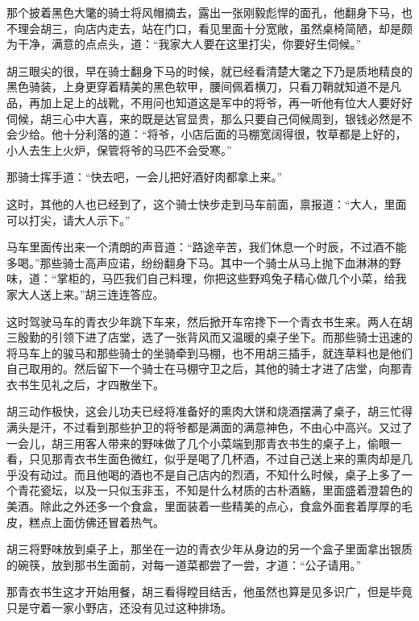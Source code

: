 那个披着黑色大氅的骑士将风帽摘去，露出一张刚毅彪悍的面孔，他翻身下马，也不理会胡三，向店内走去，站在门口，看见里面十分宽敞，虽然桌椅简陋，却是颇为干净，满意的点点头，道：“我家大人要在这里打尖，你要好生伺候。”

胡三眼尖的很，早在骑士翻身下马的时候，就已经看清楚大氅之下乃是质地精良的黑色骑装，上身更穿着精美的黑色软甲，腰间佩着横刀，只看刀鞘就知道不是凡品，再加上足上的战靴，不用问也知道这是军中的将爷，再一听他有位大人要好好伺候，胡三心中大喜，来的既是达官显贵，那么只要自己伺候周到，银钱必然是不会少给。他十分利落的道：“将爷，小店后面的马棚宽阔得很，牧草都是上好的，小人去生上火炉，保管将爷的马匹不会受寒。”

那骑士挥手道：“快去吧，一会儿把好酒好肉都拿上来。”

这时，其他的人也已经到了，这个骑士快步走到马车前面，禀报道：“大人，里面可以打尖，请大人示下。”

马车里面传出来一个清朗的声音道：“路途辛苦，我们休息一个时辰，不过酒不能多喝。”那些骑士高声应诺，纷纷翻身下马。其中一个骑士从马上抛下血淋淋的野味，道：“掌柜的，马匹我们自己料理，你把这些野鸡兔子精心做几个小菜，给我家大人送上来。”胡三连连答应。

这时驾驶马车的青衣少年跳下车来，然后掀开车帘搀下一个青衣书生来。两人在胡三殷勤的引领下进了店堂，选了一张背风而又温暖的桌子坐下。而那些骑士迅速的将马车上的骏马和那些骑士的坐骑牵到马棚，也不用胡三插手，就连草料也是他们自己取用的。然后留下一个骑士在马棚守卫之后，其他的骑士才进了店堂，向那青衣书生见礼之后，才四散坐下。

胡三动作极快，这会儿功夫已经将准备好的熏肉大饼和烧酒摆满了桌子，胡三忙得满头是汗，不过看到那些护卫的将爷都是满面的满意神色，不由心中高兴。又过了一会儿，胡三用客人带来的野味做了几个小菜端到那青衣书生的桌子上，偷眼一看，只见那青衣书生面色微红，似乎是喝了几杯酒，不过自己送上来的熏肉却是几乎没有动过。而且他喝的酒也不是自己店内的烈酒，不知什么时候，桌子上多了一个青花瓷坛，以及一只似玉非玉，不知是什么材质的古朴酒觞，里面盛着澄碧色的美酒。除此之外还多一个食盒，里面装着一些精美的点心，食盒外面套着厚厚的毛皮，糕点上面仿佛还冒着热气。

胡三将野味放到桌子上，那坐在一边的青衣少年从身边的另一个盒子里面拿出银质的碗筷，放到那书生面前，对每一道菜都尝了一尝，才道：“公子请用。”

那青衣书生这才开始用餐，胡三看得瞠目结舌，他虽然也算是见多识广，但是毕竟只是守着一家小野店，还没有见过这种排场。

